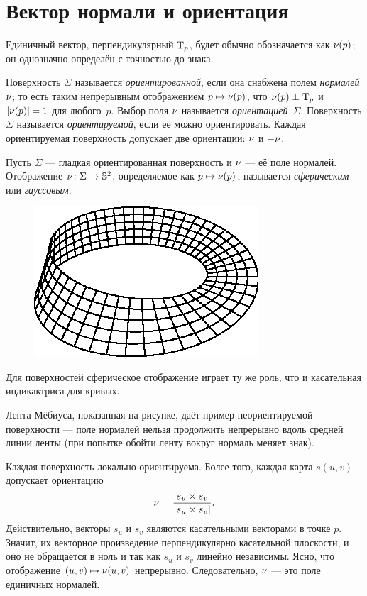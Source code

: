  \section{Вектор нормали и ориентация}
 
Единичный вектор, перпендикулярный $\mathrm{T}_p$, будет обычно обозначается как $\nu(p)$;
он однозначно определён с точностью до знака.

Поверхность $\Sigma$ называется \emph{ориентированной}, если она снабжена полем  \emph{нормалей} $\nu$;
то есть таким непрерывным отображением $p\mapsto \nu(p)$, что $\nu(p)\perp\mathrm{T}_p$ и $|\nu(p)|=1$ для любого~$p$.
Выбор поля $\nu$ называется {}\emph{ориентацией}~$\Sigma$.
Поверхность $\Sigma$ называется {}\emph{ориентируемой}, если её можно ориентировать.
Каждая ориентируемая поверхность допускает две ориентации: $\nu$ и $-\nu$.

Пусть $\Sigma$ --- гладкая ориентированная поверхность и $\nu$ --- её поле нормалей.
Отображение $\nu\colon\Sigma\to \mathbb{S}^2$, определяемое как $p\mapsto \nu(p)$, называется \emph{сферическим} или \emph{гауссовым}.

\begin{figure}
\vskip-7mm
\centering
\includegraphics{asy/moebius}
\vskip-1mm
\end{figure}

Для поверхностей сферическое отображение играет ту же роль, что и касательная индикактриса для кривых.

Лента Мёбиуса, показанная на рисунке, даёт пример неориентируемой поверхности --- поле нормалей нельзя продолжить непрерывно вдоль средней линии ленты (при попытке обойти ленту вокруг нормаль меняет знак).

Каждая поверхность локально ориентируема.
Более того, каждая карта $s(u,v)$ допускает ориентацию 
\[\nu=
\frac{s_u\times s_v}
{\left|s_u\times s_v\right|}.\]
Действительно, векторы $s_u$ и $s_v$ являются касательными векторами в точке $p$.
Значит, их векторное произведение перпендикулярно касательной плоскости,
и оно не обращается в ноль
и так как $s_u$ и $s_v$ линейно независимы.
Ясно, что отображение $(u,v)\mapsto \nu(u,v)$ непрерывно.
Следовательно, $\nu$ --- это поле единичных нормалей.

